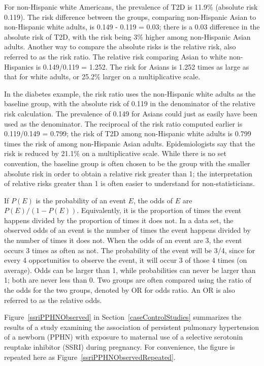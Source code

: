 For non-Hispanic white Americans, the prevalence of T2D is 11.9\% (absolute risk 0.119). The risk difference between the groups, comparing non-Hispanic Asian to non-Hispanic white adults, is 0.149 - 0.119 = 0.03; there is a 0.03 difference in the absolute risk of T2D, with the risk being 3\% higher among non-Hispanic Asian adults. Another way to compare the absolute risks is the relative risk, also referred to as the risk ratio. The relative risk comparing Asian to white non-Hispanics is 0.149/0.119 = 1.252.  The risk for Asians is 1.252 times as large as that for white adults, or 25.2\% larger on a multiplicative scale. 

In the diabetes example, the risk ratio uses the non-Hispanic white adults as the baseline group, with the absolute risk of 0.119 in the denominator of the relative risk calculation. The prevalence of 0.149 for Asians could just as easily have been used as the denominator. The reciprocal of the risk ratio computed earlier is 0.119/0.149 = 0.799; the risk of T2D among non-Hispanic white adults is 0.799 times the risk of among non-Hispanic Asian adults.  Epidemiologists say that the risk is reduced by 21.1\% on a multiplicative scale.  While there is no set convention, the baseline group is often chosen to be the group with the smaller absolute risk in order to obtain a relative risk greater than 1; the interpretation of relative risks greater than 1 is often easier to understand for non-statisticians. 

If $P(E)$ is the probability of an event $E$, the odds of $E$ are $P(E)/(1 - P(E))$.  Equivalently, it is the proportion of times the event happens divided by the proportion of times it does not.   In a data set, the observed odds of an event is the number of times the event happens divided by the number of times it does not. When the odds of an event are 3, the event occurs 3 times as often as not.  The probability of the event will be 3/4, since for every 4 opportunities to observe the event, it will occur 3 of those 4 times (on average).   Odds can be larger than 1, while probabilities can never be larger than 1; both are never less than 0.  Two groups are often compared using the ratio of the odds for the two groups, denoted by OR for odds ratio. An OR is also referred to as the relative odds.  

Figure~\ref{ssriPPHNObserved} in Section~\ref{caseControlStudies} summarizes the results of a study examining the association of persistent pulmonary hypertension of a newborn (PPHN) with exposure to maternal use of a selective serotonin reuptake inhibitor (SSRI) during pregnancy. For convenience, the figure is repeated here as Figure~\ref{ssriPPHNObservedRepeated}.

